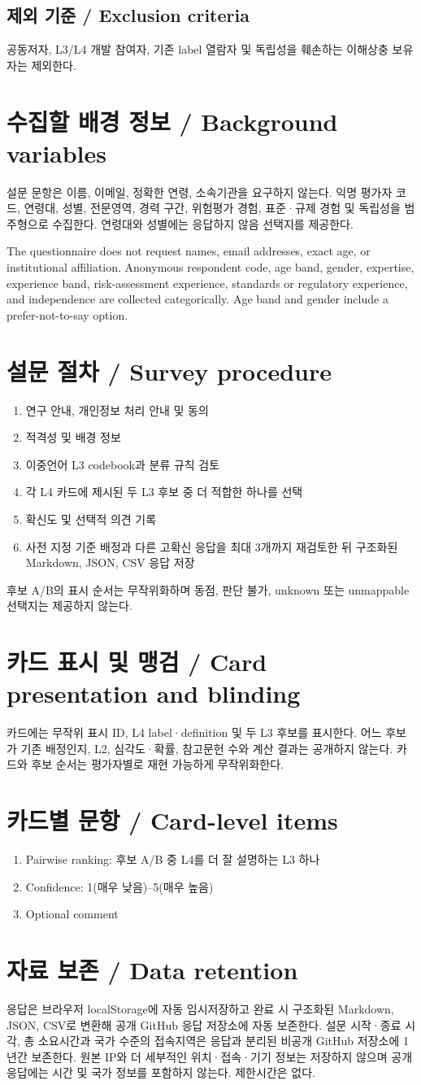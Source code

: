 \documentclass[11pt,a4paper]{article}
\newcommand{\bisection}[2]{\section{#1 / \texorpdfstring{\color{teal}}{}#2}}
\newcommand{\bisubsection}[2]{\subsection{#1 / #2}}
\begin{document}
\bisubsection{제외 기준}{Exclusion criteria}
공동저자, L3/L4 개발 참여자, 기존 label 열람자 및 독립성을 훼손하는 이해상충 보유자는 제외한다.

\bisection{수집할 배경 정보}{Background variables}
설문 문항은 이름, 이메일, 정확한 연령, 소속기관을 요구하지 않는다. 익명 평가자 코드, 연령대, 성별, 전문영역, 경력 구간, 위험평가 경험, 표준·규제 경험 및 독립성을 범주형으로 수집한다. 연령대와 성별에는 응답하지 않음 선택지를 제공한다.

The questionnaire does not request names, email addresses, exact age, or institutional affiliation. Anonymous respondent code, age band, gender, expertise, experience band, risk-assessment experience, standards or regulatory experience, and independence are collected categorically. Age band and gender include a prefer-not-to-say option.

\bisection{설문 절차}{Survey procedure}
\begin{enumerate}
\item 연구 안내, 개인정보 처리 안내 및 동의
\item 적격성 및 배경 정보
\item 이중언어 L3 codebook과 분류 규칙 검토
\item 각 L4 카드에 제시된 두 L3 후보 중 더 적합한 하나를 선택
\item 확신도 및 선택적 의견 기록
\item 사전 지정 기준 배정과 다른 고확신 응답을 최대 3개까지 재검토한 뒤 구조화된 Markdown, JSON, CSV 응답 저장
\end{enumerate}
후보 A/B의 표시 순서는 무작위화하며 동점, 판단 불가, unknown 또는 unmappable 선택지는 제공하지 않는다.

\bisection{카드 표시 및 맹검}{Card presentation and blinding}
카드에는 무작위 표시 ID, L4 label·definition 및 두 L3 후보를 표시한다. 어느 후보가 기존 배정인지, L2, 심각도·확률, 참고문헌 수와 계산 결과는 공개하지 않는다. 카드와 후보 순서는 평가자별로 재현 가능하게 무작위화한다.

\bisection{카드별 문항}{Card-level items}
\begin{enumerate}
\item Pairwise ranking: 후보 A/B 중 L4를 더 잘 설명하는 L3 하나
\item Confidence: 1(매우 낮음)--5(매우 높음)
\item Optional comment
\end{enumerate}

\bisection{자료 보존}{Data retention}
응답은 브라우저 localStorage에 자동 임시저장하고 완료 시 구조화된 Markdown, JSON, CSV로 변환해 공개 GitHub 응답 저장소에 자동 보존한다. 설문 시작·종료 시각, 총 소요시간과 국가 수준의 접속지역은 응답과 분리된 비공개 GitHub 저장소에 1년간 보존한다. 원본 IP와 더 세부적인 위치·접속·기기 정보는 저장하지 않으며 공개 응답에는 시간 및 국가 정보를 포함하지 않는다. 제한시간은 없다.
\end{document}
